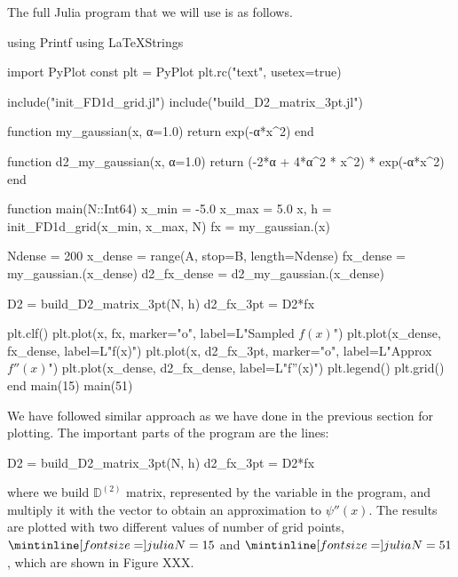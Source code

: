 The full Julia program that we will use is as follows.
\begin{juliacode}
using Printf
using LaTeXStrings

import PyPlot
const plt = PyPlot
plt.rc("text", usetex=true)

include("init_FD1d_grid.jl")
include("build_D2_matrix_3pt.jl")

function my_gaussian(x, α=1.0)
    return exp(-α*x^2)
end

function d2_my_gaussian(x, α=1.0)
    return (-2*α + 4*α^2 * x^2) * exp(-α*x^2)
end

function main(N::Int64)
    x_min = -5.0
    x_max =  5.0
    x, h = init_FD1d_grid(x_min, x_max, N)
    fx = my_gaussian.(x)

    Ndense = 200
    x_dense = range(A, stop=B, length=Ndense)
    fx_dense = my_gaussian.(x_dense)
    d2_fx_dense = d2_my_gaussian.(x_dense)

    D2 = build_D2_matrix_3pt(N, h)
    d2_fx_3pt = D2*fx

    plt.clf()
    plt.plot(x, fx, marker="o", label=L"Sampled $f(x)$")
    plt.plot(x_dense, fx_dense, label=L"f(x)")
    plt.plot(x, d2_fx_3pt, marker="o",
        label=L"Approx $f''(x)$")
    plt.plot(x_dense, d2_fx_dense, label=L"f''(x)")
    plt.legend()
    plt.grid()
end
main(15)
main(51)
\end{juliacode}

We have followed similar approach as we have done in the previous section for plotting.
The important parts of the program are the lines:
\begin{juliacode}
D2 = build_D2_matrix_3pt(N, h)
d2_fx_3pt = D2*fx
\end{juliacode}
where we build $\mathbb{D}^{(2)}$ matrix, represented by the variable
 in the program, and multiply it with the vector 
to obtain an approximation to $\psi''(x)$. The results are plotted with two
different values of number of grid points, $\jlinline{N=15}$ and $\jlinline{N=51}$,
which are shown in Figure XXX.

